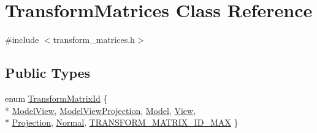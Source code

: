 \hypertarget{class_transform_matrices}{}\section{Transform\+Matrices Class Reference}
\label{class_transform_matrices}


{\ttfamily \#include $<$transform\+\_\+matrices.\+h$>$}

\subsection*{Public Types}
\begin{DoxyCompactItemize}
\item 
enum \hyperlink{class_transform_matrices_ac0c0f9ab5279bfd44b4c1fd97f041521}{Transform\+Matrix\+Id} \{ \\*
\hyperlink{class_transform_matrices_ac0c0f9ab5279bfd44b4c1fd97f041521aee88edce09f8010e45d1e053b33d609b}{Model\+View}, 
\hyperlink{class_transform_matrices_ac0c0f9ab5279bfd44b4c1fd97f041521a84870f05e92eaa6f7b91b600ed85019a}{Model\+View\+Projection}, 
\hyperlink{class_transform_matrices_ac0c0f9ab5279bfd44b4c1fd97f041521a76b154ed10408933a7638da9ff4e6e5d}{Model}, 
\hyperlink{class_transform_matrices_ac0c0f9ab5279bfd44b4c1fd97f041521a444aed1ca459a3f599c8453ef1098545}{View}, 
\\*
\hyperlink{class_transform_matrices_ac0c0f9ab5279bfd44b4c1fd97f041521af92ac52cd169b388552c7003a69a4c84}{Projection}, 
\hyperlink{class_transform_matrices_ac0c0f9ab5279bfd44b4c1fd97f041521ae5c37d34dc3dd374136583410c7264a4}{Normal}, 
\hyperlink{class_transform_matrices_ac0c0f9ab5279bfd44b4c1fd97f041521ab965bf222ccfc04ae4da8711b738b6c7}{T\+R\+A\+N\+S\+F\+O\+R\+M\+\_\+\+M\+A\+T\+R\+I\+X\+\_\+\+I\+D\+\_\+\+M\+A\+X}
 \}
\end{DoxyCompactItemize}
